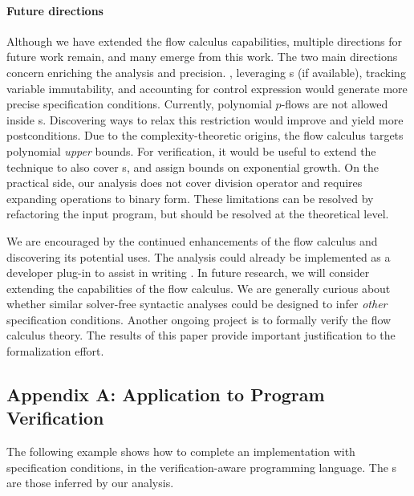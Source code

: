 \paragraph*{Future directions}
Although we have extended the flow calculus capabilities,
multiple directions for future work remain, and many emerge from this work. The
two main directions concern enriching the analysis  and
precision. \Eg, leveraging s (if available), tracking variable
immutability, and accounting for control expression would generate more precise
specification conditions. Currently, polynomial \(p\)-flows are not allowed
inside s. Discovering ways to relax this restriction would
improve  and yield more postconditions. Due to the
complexity-theoretic origins, the flow
calculus  targets polynomial \emph{upper} bounds. For verification, it would be useful to extend the technique to also
cover s, and assign bounds on exponential growth. On the
practical side, our analysis does not cover division operator and requires
expanding operations to binary form. These limitations can be resolved by
refactoring the input program, but should be resolved at the theoretical level.

We are encouraged by the continued enhancements of the flow
calculus and discovering its potential uses. The analysis
could already be implemented as a developer plug-in to assist in writing
. In future research, we will consider extending the
capabilities of the flow calculus. We are generally curious
about whether similar solver-free syntactic analyses could be designed to infer
\emph{other} specification conditions. Another ongoing
project is to formally verify the flow calculus
theory. The results of this paper provide important justification to the
formalization effort.

\clearpage

\subsection{Appendix A: Application to Program Verification}
\label{app:sec:verified}

The following example shows how to complete an implementation with
specification conditions, in the verification-aware
 programming language. The s are those inferred by
our analysis.

